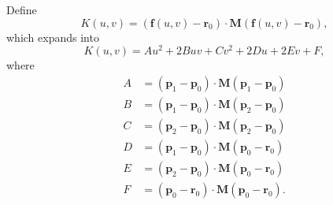 Define
\begin{equation}
    K(u,v) = (\bm{f}(u,v) - \bm{r}_0) \cdot \bm{M}(\bm{f}(u,v) - \bm{r}_0),
\end{equation}
which expands into 
\begin{equation}
    K(u,v) = Au^2 + 2Buv + Cv^2 + 2Du + 2Ev + F,
\end{equation}
where
\begin{align}
    A &= (\bm{p}_1 - \bm{p}_0) \cdot \bm{M} (\bm{p}_1 - \bm{p}_0) \\
    B &= (\bm{p}_1 - \bm{p}_0) \cdot \bm{M} (\bm{p}_2 - \bm{p}_0) \\
    C &= (\bm{p}_2 - \bm{p}_0) \cdot \bm{M} (\bm{p}_2 - \bm{p}_0) \\
    D &= (\bm{p}_1 - \bm{p}_0) \cdot \bm{M} (\bm{p}_0 - \bm{r}_0) \\
    E &= (\bm{p}_2 - \bm{p}_0) \cdot \bm{M} (\bm{p}_0 - \bm{r}_0) \\
    F &= (\bm{p}_0 - \bm{r}_0) \cdot \bm{M} (\bm{p}_0 - \bm{r}_0).
\end{align}

